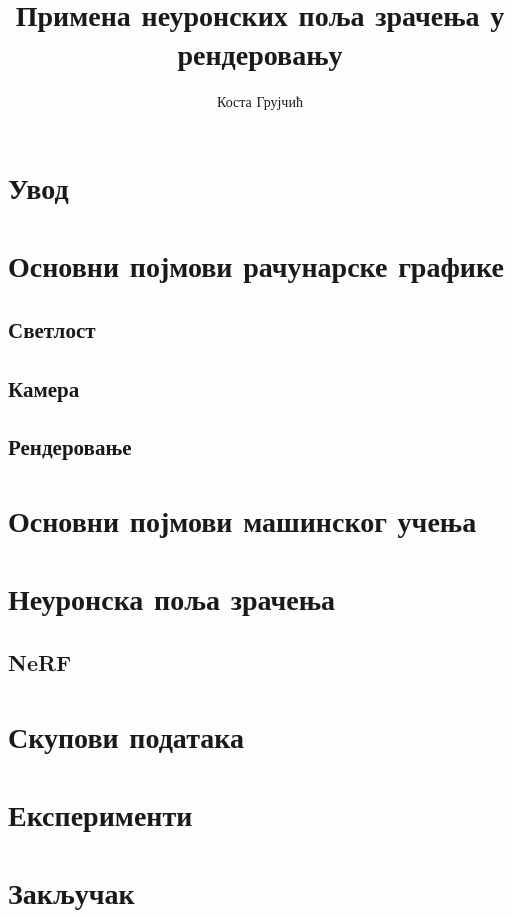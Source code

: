 \documentclass[11pt, a4paper]{article}
\title{Примена неуронских поља зрачења у рендеровању}
\author{Коста Грујчић}
\begin{document}
\maketitle

\begin{abstract}
\end{abstract}

\tableofcontents

\section{Увод}
\section{Основни појмови рачунарске графике}
\subsection{Светлост}
\subsection{Камера}
\subsection{Рендеровање}
\section{Основни појмови машинског учења}
\section{Неуронска поља зрачења}
\subsection{NeRF}
\section{Скупови података}
\section{Експерименти}
\section{Закључак}
\end{document}
